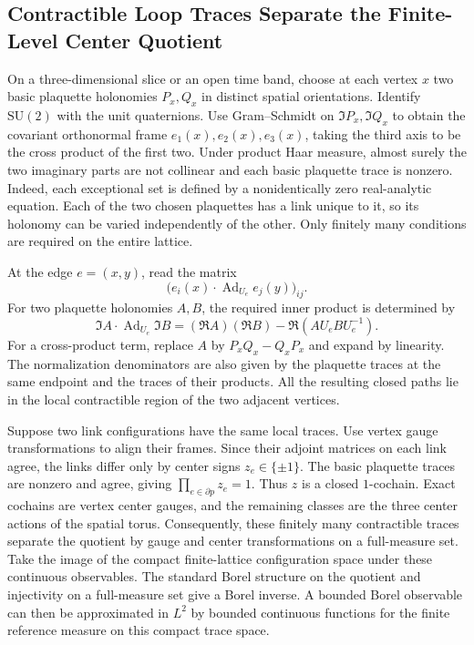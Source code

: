 \documentclass[11pt,a4paper]{article}
\numberwithin{equation}{section}
\begin{document}
\subsection{Contractible Loop Traces Separate the Finite-Level Center Quotient}
\label{app:cam-loop}

On a three-dimensional slice or an open time band, choose at each vertex \(x\) two basic plaquette holonomies \(P_x,Q_x\) in distinct spatial orientations. Identify \(\mathrm{SU}(2)\) with the unit quaternions. Use Gram--Schmidt on \(\Im P_x,\Im Q_x\) to obtain the covariant orthonormal frame \(e_1(x),e_2(x),e_3(x)\), taking the third axis to be the cross product of the first two. Under product Haar measure, almost surely the two imaginary parts are not collinear and each basic plaquette trace is nonzero. Indeed, each exceptional set is defined by a nonidentically zero real-analytic equation. Each of the two chosen plaquettes has a link unique to it, so its holonomy can be varied independently of the other. Only finitely many conditions are required on the entire lattice.

At the edge \(e=(x,y)\), read the matrix
\[
        \bigl(e_i(x)\cdot\operatorname{Ad}_{U_e}e_j(y)\bigr)_{ij}.
\]
For two plaquette holonomies \(A,B\), the required inner product is determined by
\[
 \Im A\cdot\operatorname{Ad}_{U_e}\Im B
   =(\Re A)(\Re B)-\Re(AU_eBU_e^{-1}).
\]
For a cross-product term, replace \(A\) by \(P_xQ_x-Q_xP_x\) and expand by linearity. The normalization denominators are also given by the plaquette traces at the same endpoint and the traces of their products. All the resulting closed paths lie in the local contractible region of the two adjacent vertices.

Suppose two link configurations have the same local traces. Use vertex gauge transformations to align their frames. Since their adjoint matrices on each link agree, the links differ only by center signs \(z_e\in\{\pm1\}\). The basic plaquette traces are nonzero and agree, giving \(\prod_{e\in\partial p}z_e=1\). Thus \(z\) is a closed \(1\)-cochain. Exact cochains are vertex center gauges, and the remaining classes are the three center actions of the spatial torus. Consequently, these finitely many contractible traces separate the quotient by gauge and center transformations on a full-measure set. Take the image of the compact finite-lattice configuration space under these continuous observables. The standard Borel structure on the quotient and injectivity on a full-measure set give a Borel inverse. A bounded Borel observable can then be approximated in \(L^2\) by bounded continuous functions for the finite reference measure on this compact trace space.
\end{document}
